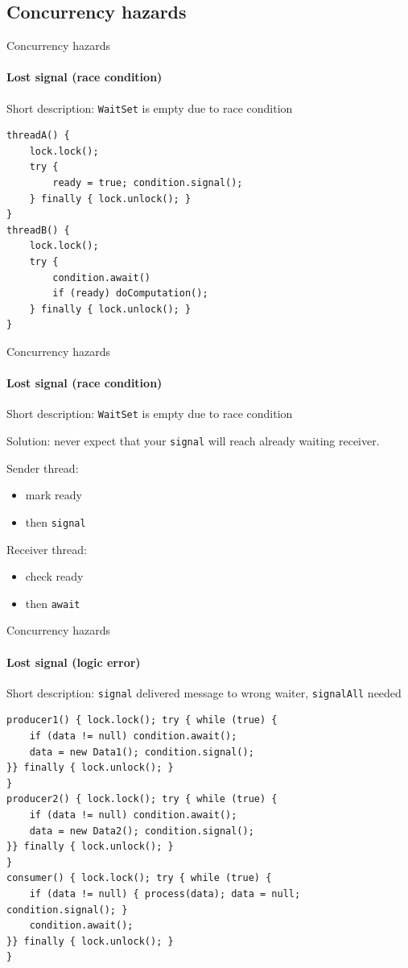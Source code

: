 \subsection{Concurrency hazards}
\showTOCSub

\begin{frame}[t, fragile]{Concurrency hazards}
\framesubtitle{Lost signal (race condition)}

Short description: \texttt{WaitSet} is empty due to race condition

\begin{verbatim}
threadA() {
    lock.lock();
    try {
        ready = true; condition.signal();
    } finally { lock.unlock(); }
}
threadB() {
    lock.lock();
    try {
        condition.await()
        if (ready) doComputation();
    } finally { lock.unlock(); }
}
\end{verbatim}
\end{frame}


\begin{frame}{Concurrency hazards}
\framesubtitle{Lost signal (race condition)}

Short description: \texttt{WaitSet} is empty due to race condition

Solution: never expect that your \texttt{signal} will reach already waiting receiver. 

Sender thread:
\begin{itemize}
    \item mark ready
    \item then \texttt{signal}
\end{itemize}

Receiver thread:
\begin{itemize}
    \item check ready
    \item then \texttt{await}
\end{itemize}
\end{frame}


\begin{frame}[t,fragile]{Concurrency hazards}
\framesubtitle{Lost signal (logic error)}
Short description: \texttt{signal} delivered message to wrong waiter, \texttt{signalAll} needed

\begin{verbatim}
producer1() { lock.lock(); try { while (true) {
    if (data != null) condition.await();
    data = new Data1(); condition.signal();
}} finally { lock.unlock(); } 
}
producer2() { lock.lock(); try { while (true) {
    if (data != null) condition.await();
    data = new Data2(); condition.signal();
}} finally { lock.unlock(); }
}
consumer() { lock.lock(); try { while (true) {
    if (data != null) { process(data); data = null; condition.signal(); }
    condition.await();
}} finally { lock.unlock(); }
}
\end{verbatim}
\end{frame}


